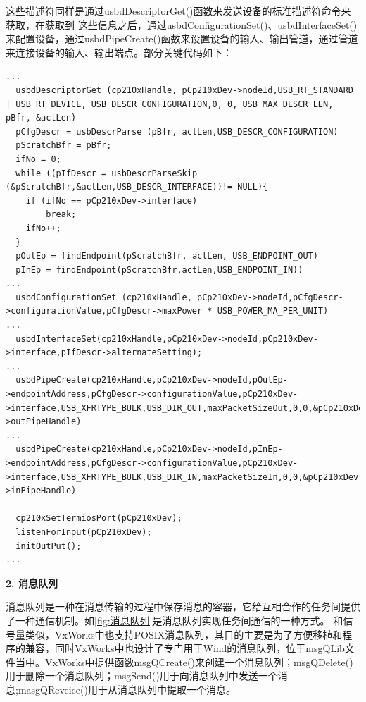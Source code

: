 这些描述符同样是通过usbdDescriptorGet()函数来发送设备的标准描述符命令来获取，在获取到
这些信息之后，通过usbdConfigurationSet()、usbdInterfaceSet()来配置设备，通过usbdPipeCreate()函数来设置设备的输入、输出管道，通过管道来连接设备的输入、输出端点。部分关键代码如下：
\lstset{language=C}
\begin{lstlisting}
...  
  usbdDescriptorGet (cp210xHandle, pCp210xDev->nodeId,USB_RT_STANDARD | USB_RT_DEVICE, USB_DESCR_CONFIGURATION,0, 0, USB_MAX_DESCR_LEN, pBfr, &actLen) 
  pCfgDescr = usbDescrParse (pBfr, actLen,USB_DESCR_CONFIGURATION)
  pScratchBfr = pBfr;
  ifNo = 0;
  while ((pIfDescr = usbDescrParseSkip (&pScratchBfr,&actLen,USB_DESCR_INTERFACE))!= NULL){
    if (ifNo == pCp210xDev->interface)
		break;
	ifNo++;
  }
  pOutEp = findEndpoint(pScratchBfr, actLen, USB_ENDPOINT_OUT)
  pInEp = findEndpoint(pScratchBfr,actLen,USB_ENDPOINT_IN))
...  
  usbdConfigurationSet (cp210xHandle, pCp210xDev->nodeId,pCfgDescr->configurationValue,pCfgDescr->maxPower * USB_POWER_MA_PER_UNIT)
...  
  usbdInterfaceSet(cp210xHandle,pCp210xDev->nodeId,pCp210xDev->interface,pIfDescr->alternateSetting);
...  
  usbdPipeCreate(cp210xHandle,pCp210xDev->nodeId,pOutEp->endpointAddress,pCfgDescr->configurationValue,pCp210xDev->interface,USB_XFRTYPE_BULK,USB_DIR_OUT,maxPacketSizeOut,0,0,&pCp210xDev->outPipeHandle)
...  
  usbdPipeCreate(cp210xHandle,pCp210xDev->nodeId,pInEp->endpointAddress,pCfgDescr->configurationValue,pCp210xDev->interface,USB_XFRTYPE_BULK,USB_DIR_IN,maxPacketSizeIn,0,0,&pCp210xDev->inPipeHandle)
  
  cp210xSetTermiosPort(pCp210xDev);
  listenForInput(pCp210xDev);
  initOutPut();
...
\end{lstlisting}




























	
\noindent \textbf{2. 消息队列}

	消息队列是一种在消息传输的过程中保存消息的容器，它给互相合作的任务间提供了一种通信机制。如\autoref{fig:消息队列}是消息队列实现任务间通信的一种方式。
	和信号量类似，VxWorks中也支持POSIX消息队列，其目的主要是为了方便移植和程序的兼容，同时VxWorks中也设计了专门用于Wind的消息队列，位于msgQLib文件当中。VxWorks中提供函数msgQCreate()来创建一个消息队列；msgQDelete()用于删除一个消息队列；msgSend()用于向消息队列中发送一个消息;masgQReveice()用于从消息队列中提取一个消息。
	

